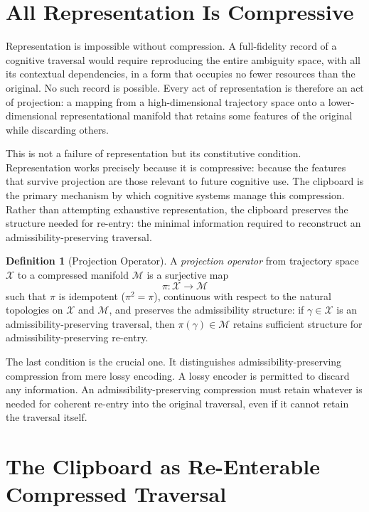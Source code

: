 \documentclass[12pt,oneside]{book}
\theoremstyle{plain}
\theoremstyle{definition}
\newtheorem{definition}[theorem]{Definition}
\theoremstyle{plain}
\newcommand{\cM}{\mathcal{M}}
\newcommand{\cX}{\mathcal{X}}
\begin{document}
\section{All Representation Is Compressive}

Representation is impossible without compression. A full-fidelity record of a cognitive traversal would require reproducing the entire ambiguity space, with all its contextual dependencies, in a form that occupies no fewer resources than the original. No such record is possible. Every act of representation is therefore an act of projection: a mapping from a high-dimensional trajectory space onto a lower-dimensional representational manifold that retains some features of the original while discarding others.

This is not a failure of representation but its constitutive condition. Representation works precisely because it is compressive: because the features that survive projection are those relevant to future cognitive use. The clipboard is the primary mechanism by which cognitive systems manage this compression. Rather than attempting exhaustive representation, the clipboard preserves the structure needed for re-entry: the minimal information required to reconstruct an admissibility-preserving traversal.

\begin{definition}[Projection Operator]
A \emph{projection operator} from trajectory space $\cX$ to a compressed manifold $\cM$ is a surjective map
\[
\pi : \cX \to \cM
\]
such that $\pi$ is idempotent ($\pi^2 = \pi$), continuous with respect to the natural topologies on $\cX$ and $\cM$, and preserves the admissibility structure: if $\gamma \in \cX$ is an admissibility-preserving traversal, then $\pi(\gamma) \in \cM$ retains sufficient structure for admissibility-preserving re-entry.
\end{definition}

The last condition is the crucial one. It distinguishes admissibility-preserving compression from mere lossy encoding. A lossy encoder is permitted to discard any information. An admissibility-preserving compression must retain whatever is needed for coherent re-entry into the original traversal, even if it cannot retain the traversal itself.

\section{The Clipboard as Re-Enterable Compressed Traversal}
\end{document}
